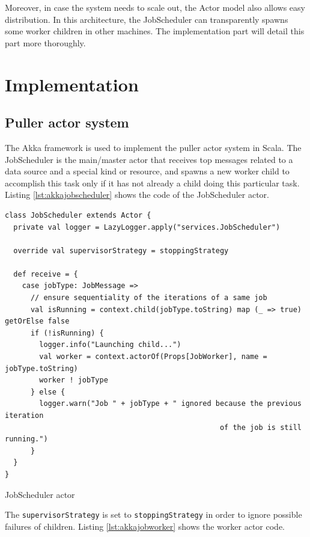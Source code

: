 Moreover, in case the system needs to scale out, the Actor model also allows easy distribution. In this architecture, the JobScheduler can transparently spawns some worker 
children in other machines. The implementation part will detail this part more thoroughly.


\section{Implementation}

\subsection{Puller actor system}

The Akka framework is used to implement the puller actor system in Scala. The JobScheduler is the main/master actor that receives top messages related to a data source and a special
kind or resource, and spawns a new worker child to accomplish this task only if it has not already a child doing this particular task. Listing \ref{lst:akkajobscheduler} shows the
code of the JobScheduler actor.

\begin{listing}[h]
\begin{verbatim}
class JobScheduler extends Actor {
  private val logger = LazyLogger.apply("services.JobScheduler")

  override val supervisorStrategy = stoppingStrategy
  
  def receive = {
    case jobType: JobMessage =>
      // ensure sequentiality of the iterations of a same job
      val isRunning = context.child(jobType.toString) map (_ => true) getOrElse false
      if (!isRunning) {
        logger.info("Launching child...")
        val worker = context.actorOf(Props[JobWorker], name = jobType.toString)
        worker ! jobType
      } else {
        logger.warn("Job " + jobType + " ignored because the previous iteration 
                                                  of the job is still running.")
      }
  }
}
\end{verbatim}
\caption{JobScheduler actor}
\label{lst:akkajobscheduler}
\end{listing}

The \verb|supervisorStrategy| is set to \verb|stoppingStrategy| in order to ignore possible failures of children. Listing \ref{lst:akkajobworker} shows the worker actor code.

